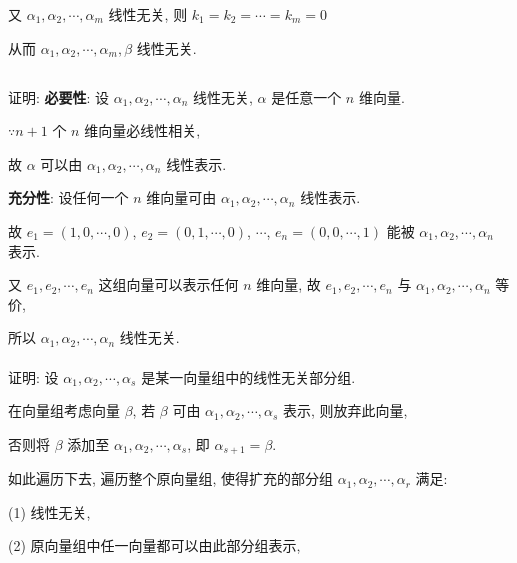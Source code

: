 		 又 \( \alpha_{1}, \alpha_{2}, \cdots, \alpha_{m} \) 线性无关, 则 \( k_{1} = k_{2} = \cdots = k_{m} = 0 \)

		 从而 \( \alpha_{1}, \alpha_{2}, \cdots, \alpha_{m}, \beta \) 线性无关.


 \subsection{} %


	 \paragraph{} %
		 证明: {\bf 必要性}: 设 \( \alpha_{1}, \alpha_{2}, \cdots, \alpha_{n} \) 线性无关, \( \alpha \) 是任意一个 \( n \) 维向量.

		 \( \because n+1 \) 个 \( n \) 维向量必线性相关,

		 故 \( \alpha \) 可以由 \( \alpha_{1}, \alpha_{2}, \cdots, \alpha_{n} \) 线性表示.

		 {\bf 充分性}: 设任何一个 \( n \) 维向量可由 \( \alpha_{1}, \alpha_{2}, \cdots, \alpha_{n} \) 线性表示.

		 故 \( e_{1} = (1, 0, \cdots, 0) \), \( e_{2} = (0, 1, \cdots, 0) \), \( \cdots \), \( e_{n} = (0, 0, \cdots, 1) \) 能被 \( \alpha_{1}, \alpha_{2}, \cdots, \alpha_{n} \) 表示.

		 又 \( e_{1}, e_{2}, \cdots, e_{n} \) 这组向量可以表示任何 \( n \) 维向量, 故 \( e_{1}, e_{2}, \cdots, e_{n} \) 与 \( \alpha_{1}, \alpha_{2}, \cdots, \alpha_{n} \) 等价,

		 所以 \( \alpha_{1}, \alpha_{2}, \cdots, \alpha_{n} \) 线性无关.


	 \paragraph{} %
		 证明: 设 \( \alpha_{1}, \alpha_{2}, \cdots, \alpha_{s} \) 是某一向量组中的线性无关部分组.

		 在向量组考虑向量 \( \beta \), 若 \( \beta \) 可由 \( \alpha_{1}, \alpha_{2}, \cdots, \alpha_{s} \) 表示, 则放弃此向量,

		 否则将 \( \beta \) 添加至 \( \alpha_{1}, \alpha_{2}, \cdots, \alpha_{s} \), 即 \( \alpha_{s+1} = \beta \).

		 如此遍历下去, 遍历整个原向量组, 使得扩充的部分组 \( \alpha_{1}, \alpha_{2}, \cdots, \alpha_{r} \) 满足:

		 \setlength{\parindent}{2em}
		 (1) 线性无关,

		 (2) 原向量组中任一向量都可以由此部分组表示,

